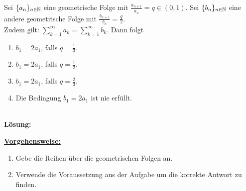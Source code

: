 \subsection*{}
Sei $ \{ a_n \}_{n \in \mathbb{N}} $ eine geometrische Folge mit 
$ \frac{a_{n+1}}{a_n} = q \in (0,1) $.
Sei $ \{ b_n \}_{n \in \mathbb{N}} $ eine andere geometrische Folge mit
$ \frac{b_{n+1}}{b_n} = \frac{q}{2} $.\\
Zudem gilt: $ \sum_{k = 1}^\infty a_k = \sum_{k = 1}^\infty b_k $.
Dann folgt
\renewcommand{\labelenumi}{(\alph{enumi})}
\begin{enumerate}
	\item 
	$ b_1 = 2 a_1 $, falls $ q = \frac{1}{3} $.
	\item
	$ b_1 = 2 a_1 $, falls $ q = \frac{1}{2} $.
	\item
	$ b_1 = 2 a_1 $, falls $ q = \frac{2}{3} $.
	\item
	Die Bedingung $ b_1 = 2 a_1 $ ist nie erfüllt.
\end{enumerate}
\ \\
\textbf{Lösung:}
\begin{mdframed}
\underline{\textbf{Vorgehensweise:}}
\renewcommand{\labelenumi}{\theenumi.}
\begin{enumerate}
\item Gebe die Reihen über die geometrischen Folgen an.
\item Verwende die Voraussetzung aus der Aufgabe um die korrekte Antwort zu finden.
\end{enumerate}
\end{mdframed}

